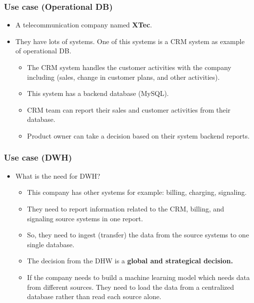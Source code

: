 \begin{frame}
\frametitle{Use case (Operational DB)}

\begin{itemize}[<+->]

\item A telecommunication company named \textbf{XTec}.
\newline
\item They have lots of systems. One of this systems is a CRM system as example of operational DB.
\begin{itemize}[<+->]

\item The CRM system handles the customer activities with the company including (sales, change in customer plans, and other activities).
\item This system has a backend database (MySQL).
\item CRM team can report their sales and customer activities from their database.
\item Product owner can take a decision based on their system backend reports.

\end{itemize}

\end{itemize}

\end{frame}


\begin{frame}
\frametitle{Use case (DWH)}

\begin{itemize}[<+->]

\item What is the need for DWH?		
\begin{itemize}[<+->]
\item This company has other systems for example: billing, charging, signaling.	
\item They need to report information related to the CRM, billing, and signaling source systems in one report.
\item So, they need to ingest (transfer) the data from the source systems to one single database.
\item The decision from the DHW is a \textbf{global and strategical decision.}
\item If the company needs to build a machine learning model which needs data from different sources. They need to load the data from a centralized database rather than read each source alone.
\end{itemize}

\end{itemize}

\end{frame}


